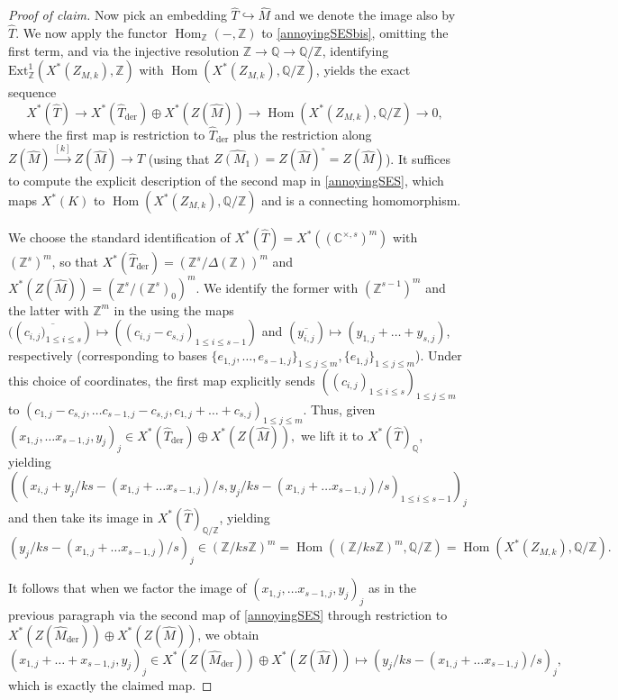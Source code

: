 \documentclass[11pt]{amsart}
\theoremstyle{definition}
\newcommand{\Z}{\mathbb{Z}}
\newcommand{\Q}{\mathbb{Q}}
\newcommand{\ov}{\overline}
\DeclareMathOperator{\Hom}{Hom}
\DeclareMathOperator{\der}{der}
\newcommand{\wh}{\widehat}
\begin{document}
\begin{proof}[Proof of claim]
Now pick an embedding $\wh{T} \hookrightarrow \wh{M}$ and we denote the image also by $\wh{T}$. We now apply the functor $\Hom_{\Z}(-,\Z)$ to \eqref{annoyingSESbis}, omitting the first term, and via the injective resolution $\Z \to \Q \to \Q/\Z$, identifying $\text{Ext}^{1}_{\Z}(X^{*}(Z_{M,k}), \Z)$ with $\Hom(X^{*}(Z_{M,k}),\Q/\Z)$, yields the exact sequence 
\begin{equation}\label{annoyingSES}
X^{*}(\widehat{T}) \to X^{*}(\widehat{T}_{\der}) \oplus X^{*}(Z(\widehat{M})) \to \Hom(X^{*}(Z_{M,k}), \Q/\Z) \to 0,
\end{equation}
where the first map is restriction to $\widehat{T}_{\der}$ plus the restriction along  $Z(\widehat{M}) \xrightarrow{[k]} Z(\widehat{M}) \rightarrow \wh{T}$ (using that $\wh{Z(M_1)} = Z(\wh{M})^{\circ} = Z(\wh{M})$). It suffices to compute the explicit description of the second map in \eqref{annoyingSES}, which maps $X^{*}(K)$ to $\Hom(X^{*}(Z_{M,k}), \Q/\Z)$ and is a connecting homomorphism.

We choose the standard identification of $X^{*}(\widehat{T}) = X^{*}((\mathbb{C}^{\times,s})^{m})$ with $(\Z^{s})^{m}$, so that $X^{*}(\widehat{T}_{\der}) = (\Z^{s}/\Delta(\Z))^{m}$ and $X^{\ast}(Z(\widehat{M})) = (\Z^{s}/(\Z^{s})_{0})^{m}$. We identify the former with $(\Z^{s-1})^{m}$ and the latter with $\Z^{m}$ in the using the maps $((\ov{c_{i,j})_{1 \leq i \leq s}}) \mapsto ((c_{i,j} - c_{s,j})_{1 \leq i \leq s-1})$ and $(\ov{y_{i,j}}) \mapsto (y_{1,j} + \dots + y_{s,j})$, respectively (corresponding to bases $\{e_{1,j}, \dots ,e_{s-1,j}\}_{1 \leq j \leq m}, \{e_{1,j}\}_{1 \leq j \leq m}$). Under this choice of coordinates, the first map explicitly sends $((c_{i,j})_{1 \leq i \leq s})_{1 \leq j \leq m}$ to $(c_{1,j} -c_{s,j}, \dots c_{s-1,j}-c_{s,j},c_{1,j}+ \dots + c_{s,j})_{1 \leq j \leq m}$. Thus, given $(x_{1,j}, \dots x_{s-1,j}, y_{j})_{j} \in X^{*}(\widehat{T}_{\der}) \oplus X^{*}(Z(\widehat{M})),$ we lift it to $X^{*}(\widehat{T})_{\Q}$, yielding $((x_{i,j}+y_{j}/ks - (x_{1,j} + \dots x_{s-1,j})/s, y_{j}/ks - (x_{1,j} + \dots x_{s-1,j})/s)_{1 \leq i \leq s-1})_{j}$ and then take its image in $X^{*}(\widehat{T})_{\Q/\Z}$, yielding 
\begin{equation*}
(y_{j}/ks - (x_{1,j} + \dots x_{s-1,j})/s)_{j} \in (\Z/ks\Z)^{m} = \Hom((\Z/ks\Z)^{m}, \Q/\Z) = \Hom(X^{*}(Z_{M,k}), \Q/\Z).
\end{equation*}

It follows that when we factor the image of $(x_{1,j}, \dots x_{s-1,j}, y_{j})_{j}$ as in the previous paragraph via the second map of \eqref{annoyingSES} through restriction to $X^{*}(Z(\widehat{M}_{\text{der}})) \oplus X^{*}(Z(\widehat{M}))$, we obtain 
\begin{equation*}
(x_{1,j} + \dots + x_{s-1,j}, y_{j})_{j} \in X^{*}(Z(\widehat{M}_{\text{der}})) \oplus X^{*}(Z(\widehat{M})) \mapsto (y_{j}/ks - (x_{1,j} + \dots x_{s-1,j})/s)_{j},
\end{equation*}
which is exactly the claimed map.

\end{proof}
\end{document}

